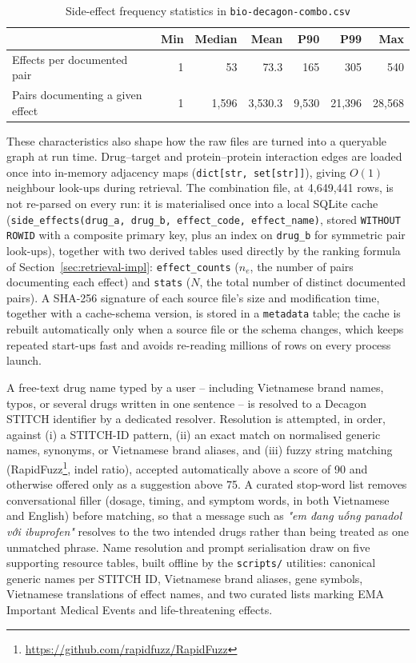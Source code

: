 \documentclass[11pt]{report}
\begin{document}
\begin{table}[t]
  \caption{Side-effect frequency statistics in \texttt{bio-decagon-combo.csv}}
  \label{tab:effect-freq}
  \centering
  \begin{tabular}{@{}lrrrrrr@{}}
    \toprule
     & Min & Median & Mean & P90 & P99 & Max \\
    \midrule
    Effects per documented pair      & 1 & 53      & 73.3    & 165   & 305    & 540 \\
    Pairs documenting a given effect & 1 & 1{,}596 & 3{,}530.3 & 9{,}530 & 21{,}396 & 28{,}568 \\
    \bottomrule
  \end{tabular}
\end{table}

These characteristics also shape how the raw files are turned into a
queryable graph at run time. Drug--target and protein--protein interaction
edges are loaded once into in-memory adjacency maps
(\texttt{dict[str, set[str]]}), giving $O(1)$ neighbour look-ups during
retrieval. The combination file, at 4{,}649{,}441 rows, is not re-parsed on
every run: it is materialised once into a local SQLite cache
(\texttt{side\_effects(drug\_a, drug\_b, effect\_code, effect\_name)},
stored \texttt{WITHOUT ROWID} with a composite primary key, plus an index on
\texttt{drug\_b} for symmetric pair look-ups), together with two derived
tables used directly by the ranking formula of
Section~\ref{sec:retrieval-impl}: \texttt{effect\_counts} ($n_e$, the number
of pairs documenting each effect) and \texttt{stats} ($N$, the total number
of distinct documented pairs). A SHA-256 signature of each source file's
size and modification time, together with a cache-schema version, is stored
in a \texttt{metadata} table; the cache is rebuilt automatically only when a
source file or the schema changes, which keeps repeated start-ups fast and
avoids re-reading millions of rows on every process launch.

A free-text drug name typed by a user -- including Vietnamese brand names,
typos, or several drugs written in one sentence -- is resolved to a Decagon
STITCH identifier by a dedicated resolver. Resolution is attempted, in
order, against (i) a STITCH-ID pattern, (ii) an exact match on normalised
generic names, synonyms, or Vietnamese brand aliases, and (iii) fuzzy string
matching (RapidFuzz\footnote{\url{https://github.com/rapidfuzz/RapidFuzz}},
indel ratio), accepted automatically above a score of 90 and otherwise
offered only as a suggestion above 75. A curated stop-word list removes
conversational filler (dosage, timing, and symptom words, in both
Vietnamese and English) before matching, so that a message such as
\emph{"em đang uống panadol với ibuprofen"} resolves to the two intended
drugs rather than being treated as one unmatched phrase. Name resolution
and prompt serialisation draw on five supporting resource tables, built
offline by the \texttt{scripts/} utilities: canonical generic names per
STITCH ID, Vietnamese brand aliases, gene symbols, Vietnamese translations
of effect names, and two curated lists marking EMA Important Medical
Events and life-threatening effects.
\end{document}
